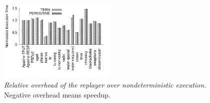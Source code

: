 
\begin{figure}[t]
\centering
\includegraphics[width=0.5\textwidth]{tern/figures/overhead}

\caption{\small {\em Relative overhead of the replayer over
    nondeterministic execution.} Negative overhead means speedup.}
\label{fig:overhead}
\end{figure}

